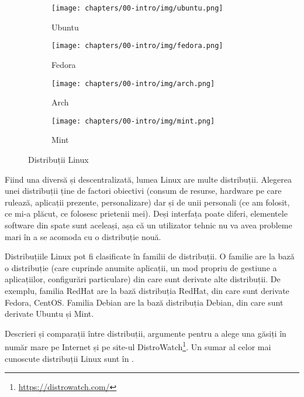 \begin{figure}[htbp]
  \centering
  \begin{subfigure}[b]{0.6\textwidth}
    \texttt{[image: chapters/00-intro/img/ubuntu.png]}
    \caption{Ubuntu}
    \label{fig:intro:distro:ubuntu}
  \end{subfigure}

  \begin{subfigure}[b]{0.6\textwidth}
    \texttt{[image: chapters/00-intro/img/fedora.png]}
    \caption{Fedora}
    \label{fig:intro:distro:fedora}
  \end{subfigure}

  \begin{subfigure}[b]{0.6\textwidth}
    \texttt{[image: chapters/00-intro/img/arch.png]}
    \caption{Arch}
    \label{fig:intro:distro:arch}
  \end{subfigure}

  \begin{subfigure}[b]{0.6\textwidth}
    \texttt{[image: chapters/00-intro/img/mint.png]}
    \caption{Mint}
    \label{fig:intro:distro:mint}
  \end{subfigure}
  \caption{Distribuții Linux}
  \label{fig:intro:distros}
\end{figure}

Fiind una diversă și descentralizată, lumea Linux are multe distribuții.
Alegerea unei distribuții ține de factori obiectivi (consum de resurse, hardware pe care rulează, aplicații prezente, personalizare) dar și de unii personali (ce am folosit, ce mi-a plăcut, ce folosesc prietenii mei).
Deși interfața poate diferi, elementele software din spate sunt aceleași, așa că un utilizator tehnic nu va avea probleme mari în a se acomoda cu o distribuție nouă.

Distribuțiile Linux pot fi clasificate în familii de distribuții.
O familie are la bază o distribuție (care cuprinde anumite aplicații, un mod propriu de gestiune a aplicațiilor, configurări particulare) din care sunt derivate alte distribuții.
De exemplu, familia RedHat are la bază distribuția RedHat, din care sunt derivate Fedora, CentOS.
Familia Debian are la bază distribuția Debian, din care sunt derivate Ubuntu și Mint.

Descrieri și comparații între distribuții, argumente pentru a alege una găsiți în număr mare pe Internet și pe site-ul DistroWatch\footnote{\url{https://distrowatch.com/}}.
Un sumar al celor mai cunoscute distribuții Linux sunt în .

